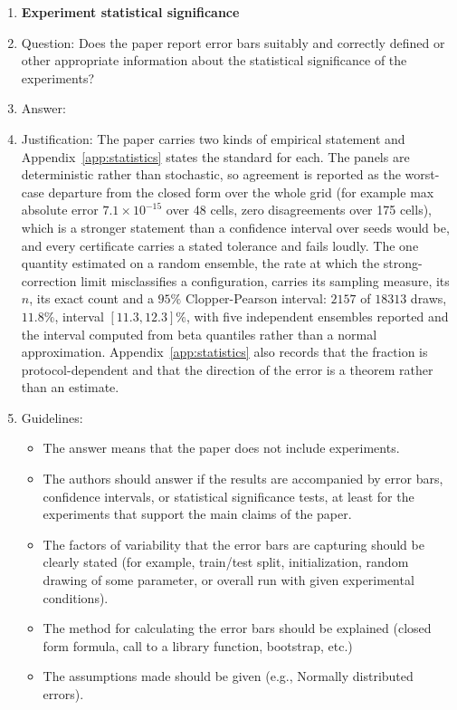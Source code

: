 \begin{enumerate}
\item {\bf Experiment statistical significance}
    \item[] Question: Does the paper report error bars suitably and correctly defined or other appropriate information about the statistical significance of the experiments?
    \item[] Answer: \answerYes{}
    \item[] Justification: The paper carries two kinds of empirical statement and Appendix~\ref{app:statistics} states the standard for each. The panels are deterministic rather than stochastic, so agreement is reported as the worst-case departure from the closed form over the whole grid (for example max absolute error $7.1\times10^{-15}$ over 48 cells, zero disagreements over 175 cells), which is a stronger statement than a confidence interval over seeds would be, and every certificate carries a stated tolerance and fails loudly. The one quantity estimated on a random ensemble, the rate at which the strong-correction limit misclassifies a configuration, carries its sampling measure, its $n$, its exact count and a $95\%$ Clopper-Pearson interval: $2157$ of $18313$ draws, $11.8\%$, interval $[11.3, 12.3]\%$, with five independent ensembles reported and the interval computed from beta quantiles rather than a normal approximation. Appendix~\ref{app:statistics} also records that the fraction is protocol-dependent and that the direction of the error is a theorem rather than an estimate.
    \item[] Guidelines:
    \begin{itemize}
        \item The answer \answerNA{} means that the paper does not include experiments.
        \item The authors should answer \answerYes{} if the results are accompanied by error bars, confidence intervals, or statistical significance tests, at least for the experiments that support the main claims of the paper.
        \item The factors of variability that the error bars are capturing should be clearly stated (for example, train/test split, initialization, random drawing of some parameter, or overall run with given experimental conditions).
        \item The method for calculating the error bars should be explained (closed form formula, call to a library function, bootstrap, etc.)
        \item The assumptions made should be given (e.g., Normally distributed errors).

\end{itemize}
\end{enumerate}
